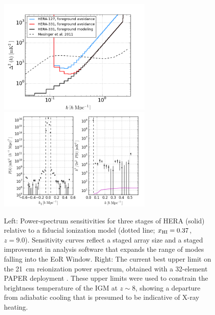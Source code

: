 \documentclass[preprint]{aastex}
\def\HI{{H{\small I }}}
\def\xHI{{x_{\rm\HI}}}
\begin{document}
\begin{figure}[t]\centering
\includegraphics[width=3in]{plots/Pspec/eor_pspec_2014.png}
\includegraphics[width=3in]{plots/Pspec/pk_k3pk.png} %
\caption{Left: Power-spectrum sensitivities for three stages of
HERA (solid) relative to a fiducial ionization model (dotted line; $\xHI=0.37$, $z=9.0$).  
Sensitivity curves reflect a staged array size and
a staged improvement in analysis software that expands the range
of modes falling into the EoR Window. %
Right: The current best upper limit on the 21~cm reionization power spectrum,
obtained with a 32-element PAPER deployment \citep{parsons_et_al2013}.  These upper limits
were used to constrain the brightness temperature of the IGM at $z\sim8$, showing
a departure from adiabatic cooling that is presumed to be indicative of X-ray heating.
}\label{fig:eor_pspec}
\end{figure}
\end{document}
